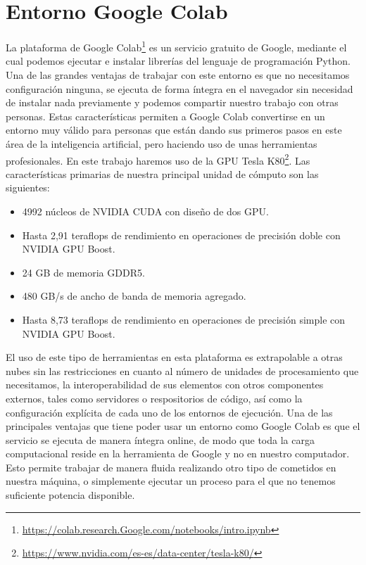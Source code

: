 \section{Entorno Google Colab}\label{sec:entorno-Google-colab}
La plataforma de Google Colab\footnote{\url{https://colab.research.Google.com/notebooks/intro.ipynb}} es un servicio gratuito de Google, mediante el cual podemos ejecutar e instalar librerías del lenguaje de programación Python.
Una de las grandes ventajas de trabajar con este entorno es que no necesitamos configuración ninguna, se ejecuta de forma íntegra en el navegador sin necesidad de instalar nada previamente y podemos compartir
nuestro trabajo con otras personas.
Estas características permiten a Google Colab convertirse en un entorno muy válido para personas que están dando sus primeros pasos en este área de la inteligencia artificial, pero haciendo uso
de unas herramientas profesionales.
En este trabajo haremos uso de la GPU Tesla K80\footnote{\url{https://www.nvidia.com/es-es/data-center/tesla-k80/}}.
Las características primarias de nuestra principal unidad de cómputo son las siguientes:
\begin{itemize}
    \item 4992 núcleos de NVIDIA CUDA con diseño de dos GPU\@.
    \item Hasta 2,91 teraflops de rendimiento en operaciones de precisión doble con NVIDIA GPU Boost.
    \item 24 GB de memoria GDDR5.
    \item 480 GB/s de ancho de banda de memoria agregado.
    \item Hasta 8,73 teraflops de rendimiento en operaciones de precisión simple con NVIDIA GPU Boost.
\end{itemize}

El uso de este tipo de herramientas en esta plataforma es extrapolable a otras nubes sin las restricciones en cuanto al número de unidades de procesamiento que necesitamos, la interoperabilidad de sus elementos con otros componentes externos, tales como servidores o respositorios de código, así como la configuración explícita de cada uno de los entornos de ejecución.
Una de las principales ventajas que tiene poder usar un entorno como Google Colab es que el servicio se ejecuta de manera íntegra online, de modo que toda la carga computacional reside en la herramienta de Google y no en nuestro computador.
Esto permite trabajar de manera fluida realizando otro tipo de cometidos en nuestra máquina, o simplemente ejecutar un proceso para el que no tenemos suficiente potencia disponible.
